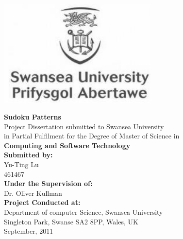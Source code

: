 \documentclass[11pt]{report}
\begin{document}
\begin{titlepage}
\centering
\includegraphics[width=0.6\textwidth]{./logo}\\ \vspace{50pt}

\Large \textbf{Sudoku Patterns}\\ \vspace{20pt}
Project Dissertation submitted to Swansea University\\ \vspace{6pt}
in Partial Fulfilment for the Degree of Master of Science  in\\ \vspace{12pt}
 \textbf{Computing and Software Technology}\\ \vspace{30pt}
\large \textbf{Submitted by:}\\ \vspace{6pt}
Yu-Ting Lu\\ \vspace{6pt}
461467 \\ \vspace{30pt}
\textbf{Under the Supervision of:}\\ \vspace{6pt}
Dr. Oliver Kullman\\ \vspace{30pt}
\textbf{Project Conducted at:}\\ \vspace{6pt}
Department of computer Science, Swansea University\\ \vspace{6pt}
Singleton Park, Swanse SA2 8PP, Wales, UK\\ \vspace{6pt}
September, 2011\\ \vspace{12pt}
\end{titlepage}
\end{document}
